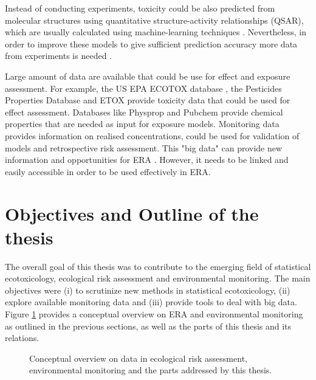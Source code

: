 Instead of conducting experiments, toxicity could be also predicted from molecular structures using quantitative structure-activity relationships (QSAR), which are usually calculated using machine-learning techniques \citep{murrell_chemically_2015, cortes-ciriano_bioalerts:_2016}. 
Nevertheless, in order to improve these models to give sufficient prediction accuracy more data from experiments is needed \citep{kuhne_read-across_2013}. 

Large amount of data are available that could be use for effect and exposure assessment. 
For example, the US EPA ECOTOX database \citep{u.s._epa_ecotoxicology_2016}, the Pesticides Properties Database \citep{lewis_international_2016} and ETOX \citep{umweltbundesamt_etox:_2016} provide toxicity data that could be used for effect assessment.
Databases like Physprop \citep{howard_physical_2016} and Pubchem \citep{kim_pubchem_2016} provide chemical properties that are needed as input for exposure models.
Monitoring data provides information on realised concentrations, could be used for validation of models and retrospective risk assessment.
This "big data" can provide new information and opportunities for ERA \citep{dafforn_big_2015}. 
However, it needs to be linked and easily accessible in order to be used effectively in ERA.



\section{Objectives and Outline of the thesis}

The overall goal of this thesis was to contribute to the emerging field of statistical ecotoxicology, ecological risk assessment and environmental monitoring.
The main objectives were (i) to scrutinize new methods in statistical ecotoxicology,
(ii) explore available monitoring data and
(iii) provide tools to deal with big data.
Figure \ref{fig:intro:overview} provides a conceptual overview on ERA and environmental monitoring as outlined in the previous sections, as well as the parts of this thesis and its relations. 

\begin{figure}[ht]
	\centering
	\resizebox{\textwidth}{!}{%
		
	}
	\caption[Conceptual overview of the topics addressed by this thesis]{Conceptual overview on data in ecological risk assessment, environmental monitoring and the parts addressed by this thesis.}
	\label{fig:intro:overview}
\end{figure}

